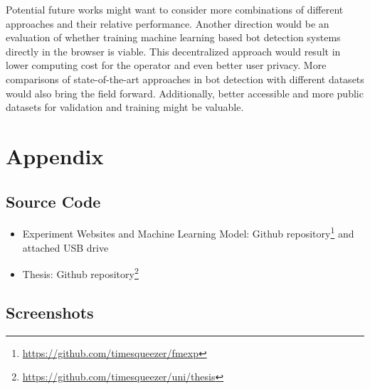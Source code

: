 \documentclass[
    fontsize=12pt,
    headings=small,
    parskip=half,           %
    bibliography=totoc,
    numbers=noenddot,       %
    open=any,               %
    final,                   %
    table
]{scrreprt}
\begin{document}
Potential future works might want to consider more combinations of different approaches and their relative performance. Another direction would be an evaluation of whether training machine learning based bot detection systems directly in the browser is viable. This decentralized approach would result in lower computing cost for the operator and even better user privacy. More comparisons of state-of-the-art approaches in bot detection with different datasets would also bring the field forward. Additionally, better accessible and more public datasets for validation and training might be valuable.

\begin{raggedright}
  \printbibliography
\end{raggedright}


\appendix

\chapter{Appendix}

\section{Source Code}

\begin{itemize}
    \item Experiment Websites and Machine Learning Model: Github repository\footnote{\url{https://github.com/timesqueezer/fmexp}} and attached USB drive
    \item Thesis: Github repository\footnote{\url{https://github.com/timesqueezer/uni/thesis}}
\end{itemize}

\section{Screenshots}
\end{document}
